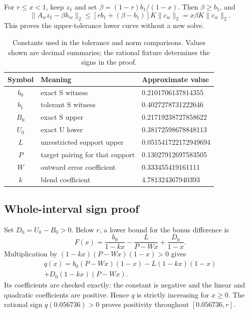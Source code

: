 \documentclass[9pt]{osa-supplemental-document}
\begin{document}
For $r\leq x<1$, keep $z_1$ and set $\beta=(1-r)b_1/(1-x)$. Then $\beta\geq b_1$, and
\begin{equation}
 \|A_wz_1-\beta h_w\|_2
 \leq[rb_1+(\beta-b_1)]K\|c_w\|_2
 =x\beta K\|c_w\|_2.
\end{equation}
This proves the upper-tolerance lower curve without a new solve.

\begin{table}[htbp]
\centering
\caption{Constants used in the tolerance and norm comparisons. Values shown are decimal summaries; the rational fixture determines the signs in the proof.}
\label{tab:constants}
\begin{tabular}{cll}
\toprule
Symbol & Meaning & Approximate value\\
\midrule
$b_0$ & exact S witness & 0.2101706137814355\\
$b_1$ & tolerant S witness & 0.4027278731222646\\
$B_0$ & exact S upper & 0.21719238727858622\\
$U_0$ & exact U lower & 0.38172598678848113\\
$L$ & unrestricted support upper & 0.051541722172949694\\
$P$ & target pairing for that support & 0.13027912697583505\\
$W$ & outward error coefficient & 0.333455419161111\\
$k$ & blend coefficient & 4.781324367940393\\
\bottomrule
\end{tabular}
\end{table}

\subsection{Whole-interval sign proof}
Set $D_0=U_0-B_0>0$. Below $r$, a lower bound for the bonus difference is
\begin{equation}
 F(x)=\frac{b_0}{1-kx}-\frac{L}{P-Wx}+\frac{D_0}{1-x}.
\end{equation}
Multiplication by $(1-kx)(P-Wx)(1-x)>0$ gives
\begin{multline}
 q(x)=b_0(P-Wx)(1-x)-L(1-kx)(1-x)\\
 +D_0(1-kx)(P-Wx).
\end{multline}
Its coefficients are checked exactly: the constant is negative and the linear and quadratic coefficients are positive. Hence $q$ is strictly increasing for $x\geq0$. The rational sign $q(0.056736)>0$ proves positivity throughout $[0.056736,r]$.
\end{document}
